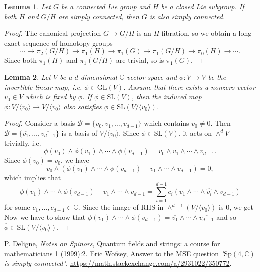 \documentclass{article}
\newtheorem{lemma}{Lemma}
\newcommand{\SL}{\mathrm{SL}}
\newcommand{\GL}{\mathrm{GL}}
\newcommand{\Sp}{\mathrm{Sp}}
\begin{document}
\begin{lemma}
\label{simply}
Let $G$ be a connected Lie group and $H$ be a closed Lie subgroup. If both $H$ and $G/H$ are simply connected, then $G$ is also simply connected. 
\end{lemma}
\begin{proof}
The canonical projection $G\to G/H$ is an $H$-fibration, so we obtain a long exact sequence of homotopy groups
$$
\cdots \to \pi_{2}(G/H)\to \pi_{1}(H) \to \pi_{1}(G) \to \pi_{1}(G/H) \to \pi_{0}(H) \to \cdots. 
$$
Since both $\pi_{1}(H)$ and $\pi_{1}(G/H)$ are trivial, so is $\pi_{1}(G)$. 
\end{proof}

\begin{lemma}
\label{det}
Let $V$ be a $d$-dimensional $\mathbb{C}$-vector space and $\phi:V\to V$ be the invertible linear map, i.e. $\phi\in \GL(V)$. Assume that there exists a nonzero vector $v_{0}\in V$ which is fixed by $\phi$. 
If $\phi\in \SL(V)$, then the induced map $\overline{\phi}:V/\langle v_{0}\rangle \to V/\langle v_{0}\rangle$ also satisfies $\overline{\phi}\in \SL(V/\langle v_{0}\rangle)$. 
\end{lemma}
\begin{proof}
Consider a basis $\mathcal{B} = \{v_{0}, v_{1}, \dots, v_{d-1}\}$ which contains $v_{0}\neq 0$. 
Then $\overline{\mathcal{B}} = \{\overline{v_{1}}, \dots, \overline{v_{d-1}}\}$ is a basis of $V/\langle v_{0}\rangle$. 
Since $\phi\in \SL(V)$, it acts on $\wedge^{d}V$ trivially, i.e. $$\phi(v_{0})\wedge \phi(v_{1})\wedge \cdots \wedge \phi(v_{d-1}) = v_{0}\wedge v_{1}\wedge \cdots \wedge v_{d-1}.$$
Since $\phi(v_{0}) = v_{0}$,  we have
$$
v_{0}\wedge (\phi(v_{1})\wedge \cdots \wedge \phi(v_{d-1}) - v_{1}\wedge \cdots \wedge v_{d-1}) = 0, 
$$
which implies that 
$$
\phi(v_{1})\wedge\cdots\wedge \phi(v_{d-1}) - v_{1}\wedge\cdots \wedge v_{d-1} = \sum_{i=1}^{d-1}c_{i}(v_{1}\wedge\cdots\wedge\widehat{v_{i}}\wedge v_{d-1})
$$
for some $c_{1}, \dots, c_{d-1}\in \mathbb{C}$. 
Since the image of RHS in $\wedge^{d-1}(V/\langle v_{0}\rangle)$ is 0, we get
Now we have to show that $\overline{\phi(v_{1})}\wedge\cdots\wedge \overline{\phi(v_{d-1})} = \overline{v_{1}}\wedge\cdots\wedge \overline{v_{d-1}}$ and so $\overline{\phi}\in \SL(V/\langle v_{0}\rangle)$.  
\end{proof}


\begin{thebibliography}{5}
P. Deligne, \emph{Notes on Spinors}, Quantum fields and strings: a course for mathematicians 1 (1999):2. 
Eric Wofsey, Answer to the MSE question \emph{"$\Sp(4, \mathbb{C})$ is simply connected"}, \url{https://math.stackexchange.com/a/2931022/350772}. 
\end{thebibliography}
\end{document}
